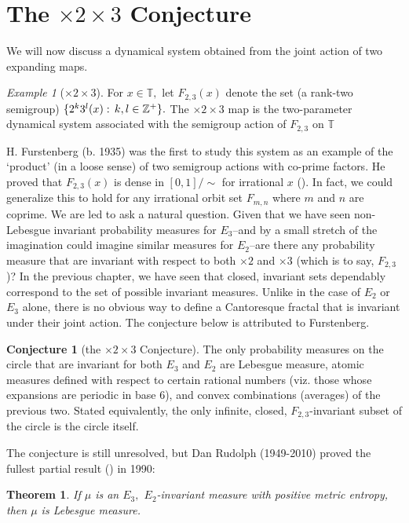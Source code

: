 \documentclass[12pt, letterpaper, oneside]{book}
\newcommand{\T}{\mathbb{T}}
\DeclarePairedDelimiter{\set}{\lbrace}{\rbrace}
\theoremstyle{plain}
\newtheorem{theorem}{Theorem}
\theoremstyle{definition}
\newtheorem{conjecture}{Conjecture}
\theoremstyle{remark}
\newtheorem{example}{Example}
\begin{document}
\section{The $\times2\times3$ Conjecture}
We will now discuss a dynamical system obtained from the joint action of two expanding maps.

\begin{example}[$\times2 \times3$]
For $x \in \T,$ let $F_{2,3}(x)$ denote the set (a rank-two semigroup) $\set{2^k3^l(x):\,k,l \in \mathbb{Z}^+}.$  The $\times2\times3$ map is the two-parameter dynamical system associated with the semigroup action of $F_{2,3}$ on $\T$ 
\end{example}

H. Furstenberg (b. 1935) was the first to study this system as an example of the `product' (in a loose sense) of two semigroup actions with co-prime factors. He proved that $F_{2,3}(x)$ is dense in $[0,1]/\sim$ for irrational $x$ (\cite{Ein09}). In fact, we could generalize this to hold for any irrational orbit set $F_{m,n}$ where $m$ and $n$ are coprime. We are led to ask a natural question. Given that we have seen non-Lebesgue  invariant probability measures for $E_3$--and by a small stretch of the imagination could imagine similar measures for $E_2$--are there any probability measure that are invariant with respect to both $\times2$ and $\times3$ (which is to say, $F_{2,3}$)? In the previous chapter, we have seen that closed, invariant sets dependably correspond to the set of possible invariant measures. Unlike in the case of $E_2$ or $E_3$ alone, there is no obvious way to define a Cantoresque fractal that is invariant under their joint action. The conjecture below is attributed to Furstenberg.

\begin{conjecture}[the $\times2 \times 3$ Conjecture]
The only probability measures on the circle that are invariant for both $E_3$ and $E_2$ are Lebesgue measure, atomic measures defined with respect to certain rational numbers (viz. those whose expansions are periodic in base 6), and convex combinations (averages) of the previous two. Stated equivalently, the only infinite, closed, $F_{2,3}$-invariant subset of the circle is the circle itself. 
\end{conjecture}

The conjecture is still unresolved, but Dan Rudolph (1949-2010) proved the fullest partial result (\cite{Rud90}) in 1990:

\begin{theorem}
If $\mu$ is an $E_3,$ $E_2$-invariant measure with positive metric entropy, then $\mu$ is Lebesgue measure. 
\end{theorem}
\end{document}
